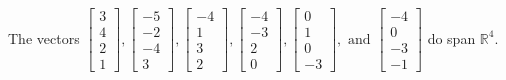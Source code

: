 \begin{exercise}
\begin{exerciseStatement}
  \end{exerciseStatement}
  \begin{exerciseAnswer}
   The vectors \(\left[\begin{array}{r}
3 \\
4 \\
2 \\
1
\end{array}\right] , \left[\begin{array}{r}
-5 \\
-2 \\
-4 \\
3
\end{array}\right] , \left[\begin{array}{r}
-4 \\
1 \\
3 \\
2
\end{array}\right] , \left[\begin{array}{r}
-4 \\
-3 \\
2 \\
0
\end{array}\right] , \left[\begin{array}{r}
0 \\
1 \\
0 \\
-3
\end{array}\right] , \text{ and } \left[\begin{array}{r}
-4 \\
0 \\
-3 \\
-1
\end{array}\right]\) 
  	 do  
	span \(\mathbb{R}^4\).
  


  \end{exerciseAnswer}
\end{exercise}